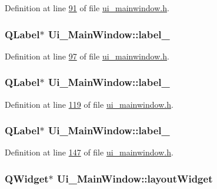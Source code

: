 Definition at line \hyperlink{a00139_source_l00091}{91} of file \hyperlink{a00139_source}{ui\+\_\+mainwindow.\+h}.

\hypertarget{a00080_a663f728e6244926a795c6e6892673b1d}{
\subsubsection[{label\+\_\+6}]{\setlength{\rightskip}{0pt plus 5cm}Q\+Label$\ast$ Ui\+\_\+\+Main\+Window\+::label\+\_}}\label{a00080_a663f728e6244926a795c6e6892673b1d}


Definition at line \hyperlink{a00139_source_l00097}{97} of file \hyperlink{a00139_source}{ui\+\_\+mainwindow.\+h}.

\hypertarget{a00080_a13936e6f18b1c90402b3c7a3c92b6cdb}{
\subsubsection[{label\+\_\+7}]{\setlength{\rightskip}{0pt plus 5cm}Q\+Label$\ast$ Ui\+\_\+\+Main\+Window\+::label\+\_}}\label{a00080_a13936e6f18b1c90402b3c7a3c92b6cdb}


Definition at line \hyperlink{a00139_source_l00119}{119} of file \hyperlink{a00139_source}{ui\+\_\+mainwindow.\+h}.

\hypertarget{a00080_af183bfbfb9f38bbdd60caf92b15e23dc}{
\subsubsection[{label\+\_\+8}]{\setlength{\rightskip}{0pt plus 5cm}Q\+Label$\ast$ Ui\+\_\+\+Main\+Window\+::label\+\_}}\label{a00080_af183bfbfb9f38bbdd60caf92b15e23dc}


Definition at line \hyperlink{a00139_source_l00147}{147} of file \hyperlink{a00139_source}{ui\+\_\+mainwindow.\+h}.

\hypertarget{a00080_ab96ab0f0578098521fa69a75aa5cdde8}{
\subsubsection[{layout\+Widget}]{\setlength{\rightskip}{0pt plus 5cm}Q\+Widget$\ast$ Ui\+\_\+\+Main\+Window\+::layout\+Widget}}\label{a00080_ab96ab0f0578098521fa69a75aa5cdde8}


